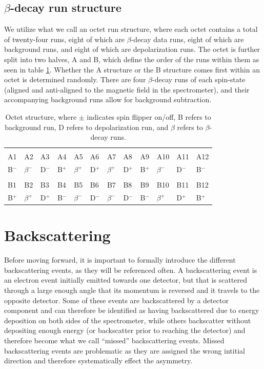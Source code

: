 \subsection{$\beta$-decay run structure}
We utilize what we call an octet run structure, where each octet contains a total of twenty-four
runs, eight of which are $\beta$-decay data runs, eight of which are background runs, and eight
of which are depolarization runs. The octet is further split into two halves, A and B, which define
the order of the runs within them as seen in table \ref{tab:octetStructure}. Whether the A structure
or the B structure comes first within an octet is determined randomly. There are four $\beta$-decay
runs of each spin-state (aligned and anti-aligned to the magnetic field in the spectrometer), and their
accompanying background runs allow for background subtraction. 

\begin{table}[h]
  \caption{Octet structure, where $\pm$ indicates spin flipper on/off,
    B refers to background run, D refers to depolarization run, and $\beta$
    refers to $\beta$-decay runs.} 
  \centering
  \begin{tabular}{llllllllllll}
    \hline \hline \\ [-1.75ex]
    A1 & A2 & A3 & A4 & A5 & A6 & A7 & A8 & A9 & A10 & A11 & A12 \\ 
    B$^-$ & $\beta^-$ & D$^-$ & B$^+$ & $\beta^+$ & D$^+$ & $\beta^+$ & D$^+$ & B$^+$ & $\beta^-$ & D$^-$ & B$^-$ \\
    \hline \\ [-1.75ex]
    B1 & B2 & B3 & B4 & B5 & B6 & B7 & B8 & B9 & B10 & B11 & B12 \\
    B$^+$ & $\beta^+$ & D$^+$ & B$^-$ & $\beta^-$ & D$^-$ & $\beta^-$ & D$^-$ & B$^-$ & $\beta^+$ & D$^+$ & B$^+$ \\
    \hline
  \end{tabular}
  \label{tab:octetStructure}
\end{table}



\section{Backscattering} \label{sec:backscattering}
Before moving forward, it is important to formally introduce the different
backscattering events, as they will be referenced often. A backscattering
event is an electron event initially emitted towards one detector, but that
is scattered through a large enough angle that its momentum is reversed and
it travels to the opposite detector. Some of these events are backscattered
by a detector component and can therefore be identified as having backscattered
due to energy deposition on both sides of the spectrometer,
while others backscatter without depositing enough energy (or backscatter prior
to reaching the detector) and therefore become what we call ``missed''
backscattering events. Missed backscattering events are problematic as they
are assigned the wrong intitial direction and therefore systematically effect
the asymmetry.

